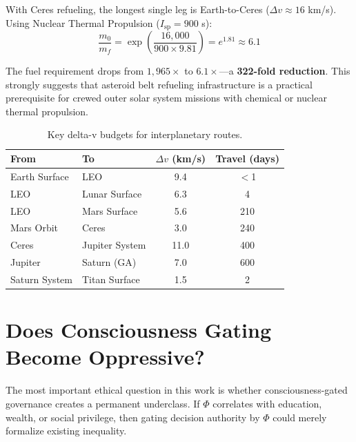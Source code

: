 \documentclass[12pt,a4paper]{article}
\begin{document}
With Ceres refueling, the longest single leg is Earth-to-Ceres ($\Delta v \approx 16$ km/s). Using Nuclear Thermal Propulsion ($I_\text{sp} = 900$ s):
\begin{equation}
    \frac{m_0}{m_f} = \exp\left(\frac{16{,}000}{900 \times 9.81}\right) = e^{1.81} \approx 6.1
\end{equation}

The fuel requirement drops from $1{,}965\times$ to $6.1\times$---a \textbf{322-fold reduction}. This strongly suggests that asteroid belt refueling infrastructure is a practical prerequisite for crewed outer solar system missions with chemical or nuclear thermal propulsion.

\begin{table}[h]
\centering
\caption{Key delta-v budgets for interplanetary routes.}
\label{tab:deltav}
\begin{tabular}{@{}llcc@{}}
\toprule
\textbf{From} & \textbf{To} & \textbf{$\Delta v$ (km/s)} & \textbf{Travel (days)} \\
\midrule
Earth Surface & LEO              & 9.4  & $<$1 \\
LEO           & Lunar Surface    & 6.3  & 4 \\
LEO           & Mars Surface     & 5.6  & 210 \\
Mars Orbit    & Ceres            & 3.0  & 240 \\
Ceres         & Jupiter System   & 11.0 & 400 \\
Jupiter       & Saturn (GA)      & 7.0  & 600 \\
Saturn System & Titan Surface    & 1.5  & 2 \\
\bottomrule
\end{tabular}
\end{table}


\section{Does Consciousness Gating Become Oppressive?}
\label{sec:oppression}

The most important ethical question in this work is whether consciousness-gated governance creates a permanent underclass. If $\Phi$ correlates with education, wealth, or social privilege, then gating decision authority by $\Phi$ could merely formalize existing inequality.
\end{document}
